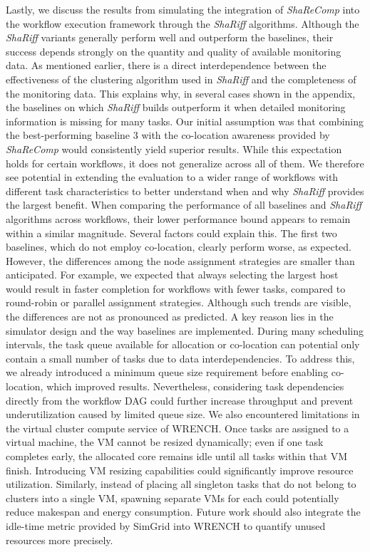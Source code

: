 Lastly, we discuss the results from simulating the integration of \textit{ShaReComp} into the workflow execution framework through the \textit{ShaRiff} algorithms. Although the \textit{ShaRiff} variants generally perform well and outperform the baselines, their success depends strongly on the quantity and quality of available monitoring data. As mentioned earlier, there is a direct interdependence between the effectiveness of the clustering algorithm used in \textit{ShaRiff} and the completeness of the monitoring data. This explains why, in several cases shown in the appendix, the baselines on which \textit{ShaRiff} builds outperform it when detailed monitoring information is missing for many tasks.
Our initial assumption was that combining the best-performing baseline 3 with the co-location awareness provided by \textit{ShaReComp} would consistently yield superior results. While this expectation holds for certain workflows, it does not generalize across all of them. We therefore see potential in extending the evaluation to a wider range of workflows with different task characteristics to better understand when and why \textit{ShaRiff} provides the largest benefit.
When comparing the performance of all baselines and \textit{ShaRiff} algorithms across workflows, their lower performance bound appears to remain within a similar magnitude. Several factors could explain this. The first two baselines, which do not employ co-location, clearly perform worse, as expected. However, the differences among the node assignment strategies are smaller than anticipated. For example, we expected that always selecting the largest host would result in faster completion for workflows with fewer tasks, compared to round-robin or parallel assignment strategies. Although such trends are visible, the differences are not as pronounced as predicted.
A key reason lies in the simulator design and the way baselines are implemented. During many scheduling intervals, the task queue available for allocation or co-location can potential only contain a small number of tasks due to data interdependencies. To address this, we already introduced a minimum queue size requirement before enabling co-location, which improved results. Nevertheless, considering task dependencies directly from the workflow DAG could further increase throughput and prevent underutilization caused by limited queue size.
We also encountered limitations in the virtual cluster compute service of WRENCH. Once tasks are assigned to a virtual machine, the VM cannot be resized dynamically; even if one task completes early, the allocated core remains idle until all tasks within that VM finish. Introducing VM resizing capabilities could significantly improve resource utilization. Similarly, instead of placing all singleton tasks that do not belong to clusters into a single VM, spawning separate VMs for each could potentially reduce makespan and energy consumption. Future work should also integrate the idle-time metric provided by SimGrid into WRENCH to quantify unused resources more precisely.
